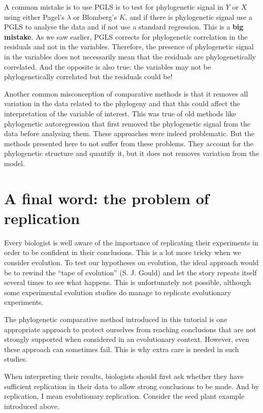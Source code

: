 \documentclass[
]{book}
\begin{document}
A common mistake is to use PGLS is to test for phylogenetic signal in \(Y\) or \(X\) using either Pagel's \(\lambda\) or Blomberg's \(K\), and if there is phylogenetic signal use a PGLS to analyse the data and if not use a standard regression. This is a \textbf{big mistake}. As we saw earlier, PGLS corrects for phylogenetic correlation in the residuals and not in the variables. Therefore, the presence of phylogenetic signal in the variables does not necessarily mean that the residuals are phylogenetically correlated. And the opposite is also true: the variables may not be phylogenetically correlated but the residuals could be!

Another common misconception of comparative methods is that it removes all variation in the data related to the phylogeny and that this could affect the interpretation of the variable of interest. This was true of old methods like phylogenetic autoregression that first removed the phylogenetic signal from the data before analysing them. These approaches were indeed problematic. But the methods presented here to not suffer from these problems. They account for the phylogenetic structure and quantify it, but it does not removes variation from the model.

\hypertarget{a-final-word-the-problem-of-replication}{%
\chapter{A final word: the problem of replication}\label{a-final-word-the-problem-of-replication}}

Every biologist is well aware of the importance of replicating their experiments in order to be confident in their conclusions. This is a lot more tricky when we consider evolution. To test our hypotheses on evolution, the ideal approach would be to rewind the ``tape of evolution'' (S. J. Gould) and let the story repeats itself several times to see what happens. This is unfortunately not possible, although some experimental evolution studies do manage to replicate evolutionary experiments.

The phylogenetic comparative method introduced in this tutorial is one appropriate approach to protect ourselves from reaching conclusions that are not strongly supported when considered in an evolutionary context. However, even these approach can sometimes fail. This is why extra care is needed in such studies.

When interpreting their results, biologists should first ask whether they have sufficient replication in their data to allow strong conclusions to be made. And by replication, I mean evolutionary replication. Consider the seed plant example introduced above.
\end{document}
